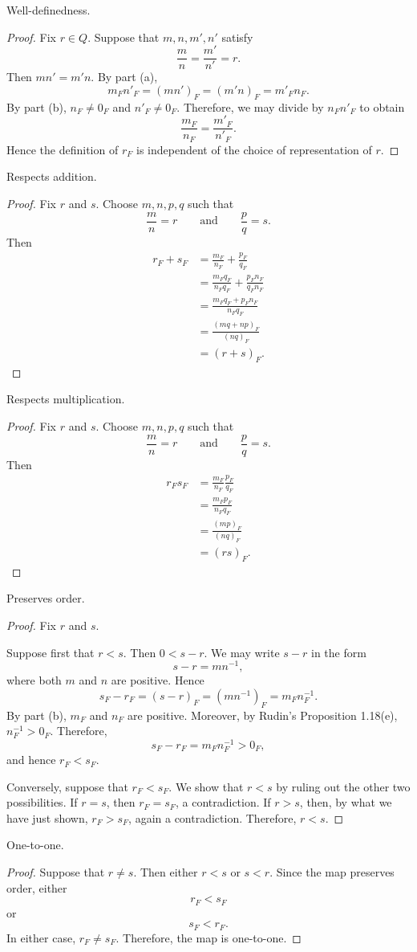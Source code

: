 \documentclass[../../../main.tex]{subfiles}
\begin{document}

Well-definedness.

\begin{proof}
	Fix $r \in Q$. Suppose that $m, n, m', n'$ satisfy
	\[
		\frac{m}{n} = \frac{m'}{n'} = r.
	\]
	Then $mn' = m'n$. By part (a),
	\[
		m_F n'_F = (mn')_F = (m'n)_F = m'_F n_F.
	\]
	By part (b), $n_F \neq 0_F$ and $n'_F \neq 0_F$. Therefore, we may divide by
	$n_F n'_F$ to obtain
	\[
		\frac{m_F}{n_F} = \frac{m'_F}{n'_F}.
	\]
	Hence the definition of $r_F$ is independent of the choice of representation of $r$.
\end{proof}

Respects addition.

\begin{proof}
	Fix $r$ and $s$. Choose $m, n, p, q$ such that
	\[
		\frac{m}{n} = r
		\qquad\text{and}\qquad
		\frac{p}{q} = s.
	\]
	Then
	\[
		\begin{aligned}
		r_F + s_F
		&= \frac{m_F}{n_F} + \frac{p_F}{q_F} \\
		&= \frac{m_F q_F}{n_F q_F} + \frac{p_F n_F}{q_F n_F} \\
		&= \frac{m_F q_F + p_F n_F}{n_F q_F} \\
		&= \frac{(mq + np)_F}{(nq)_F} \\
		&= (r + s)_F.
		\end{aligned}
	\]
\end{proof}

Respects multiplication.

\begin{proof}
	Fix $r$ and $s$. Choose $m, n, p, q$ such that
	\[
		\frac{m}{n} = r
		\qquad\text{and}\qquad
		\frac{p}{q} = s.
	\]
	Then
	\[
		\begin{aligned}
		r_F s_F
		&= \frac{m_F}{n_F}\frac{p_F}{q_F} \\
		&= \frac{m_F p_F}{n_F q_F} \\
		&= \frac{(mp)_F}{(nq)_F} \\
		&= (rs)_F.
		\end{aligned}
	\]
\end{proof}

Preserves order.

\begin{proof}
	Fix $r$ and $s$.

	Suppose first that $r < s$. Then $0 < s - r$. We may write $s - r$ in the form
	\[
		s - r = mn^{-1},
	\]
	where both $m$ and $n$ are positive. Hence
	\[
		s_F - r_F
		= (s - r)_F
		= (mn^{-1})_F
		= m_F n^{-1}_F.
	\]
	By part (b), $m_F$ and $n_F$ are positive. Moreover, by Rudin's
	Proposition 1.18(e), $n^{-1}_F > 0_F$. Therefore,
	\[
		s_F - r_F = m_F n^{-1}_F > 0_F,
	\]
	and hence $r_F < s_F$.

	Conversely, suppose that $r_F < s_F$. We show that $r < s$ by ruling out
	the other two possibilities. If $r = s$, then $r_F = s_F$, a contradiction.
	If $r > s$, then, by what we have just shown, $r_F > s_F$, again a
	contradiction. Therefore, $r < s$.
\end{proof}

One-to-one.

\begin{proof}
	Suppose that $r \neq s$. Then either $r < s$ or $s < r$. Since the map
	preserves order, either
	\[
		r_F < s_F
	\]
	or
	\[
		s_F < r_F.
	\]
	In either case, $r_F \neq s_F$. Therefore, the map is one-to-one.
\end{proof}
\end{document}
